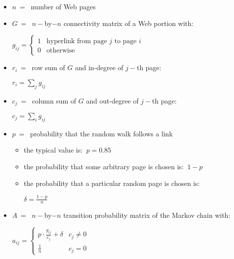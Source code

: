 \documentclass{article}
\begin{document}
\begin{itemize}
    \item $n \ = \ $ number of Web pages
    \item $G \ = \ $ $n-$by$-n$ connectivity matrix of a Web portion with:
        \begin{center}
            $g_{ij} = 
            \begin{cases}
                1 & \text{hyperlink from page } j \text{ to page } i  \\
                0 & \text{otherwise}
            \end{cases}$
        \end{center}
    \item $r_i \ = \ $ row sum of $G$ and in-degree of $j-$th page:
        \begin{center}
            $r_i = \displaystyle\sum_j g_{ij}$
        \end{center}
    \item $c_j \ = \ $ column sum of $G$ and out-degree of $j-$th page:
        \begin{center}
            $c_j = \displaystyle\sum_i g_{ij}$
        \end{center}
    \newpage
    \item $p \ = \ $ probability that the random walk follows a link
        \begin{itemize}
            \item the typical value is: $\ p = 0.85$
            \item the probability that some arbitrary page is chosen is: $\ 1 - p$
            \item the probability that a particular random page is chosen is:
                \begin{center}
                    $\delta = \displaystyle\frac{1 - p}{n}$
                \end{center}
        \end{itemize}
    \item $A \ = \ $ $n-$by$-n$ transition probability matrix of the Markov chain with:
        \begin{center}
            $a_{ij} = 
            \begin{cases}
                p \cdot \frac{g_{ij}}{c_j} + \delta & c_j \neq 0 \\
                \frac{1}{n} & c_j = 0
            \end{cases}$
        \end{center}
\end{itemize}
\end{document}

